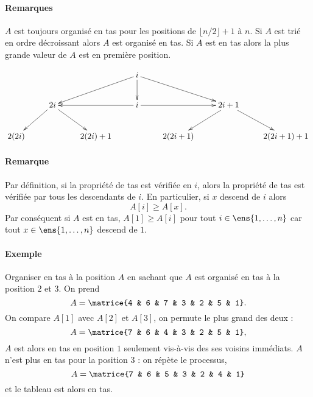 \documentclass{mybourbaki}
\begin{document}
 \paragraph{Remarques}$A$ est toujours organisé en tas pour les positions de $\lfloor n/2 \rfloor +1 $ à $n$. Si $A$ est trié en ordre décroissant alors $A$ est organisé en tas. Si $A$ est en tas alors la plus grande valeur de $A$ est en première position.
 
\[ 
\xymatrix{
& &&\ar[lld] i\ar[d] \ar[rrd]&&&\\
&\ar[ld] 2i \ar[rd] & & \ar[ll]i \ar[rr]& &\ar[ld] 2i +1 \ar[rd]& \\
2(2i) & & 2(2i)+1 & & 2(2i +1)& & 2(2i+1) +1 
}
\]


\paragraph{Remarque}Par définition, si la propriété de tas est vérifiée en $i$, alors la propriété de tas est vérifiée par tous les descendants de $i$. En particulier, si $x$ descend de $i$ alors $$A[i] \geq A[x].$$Par conséquent si $A$ est en tas, $A[1] \geq A[i]$ pour tout $i\in \ens{1,\ldots,n}$ car tout $x\in \ens{1,\ldots,n}$ descend de $1$.

\paragraph{Exemple}Organiser en tas à la position $A$ en sachant que $A$ est organisé en tas à la position $2$ et $3$. On prend $$A = \matrice{4 & 6 & 7 & 3 & 2 & 5 & 1}.$$
On compare $A[1]$ avec $A[2]$ et $A[3]$, on permute le plus grand des deux :
\[ A = \matrice{7 & 6 & 4 & 3 & 2 & 5 & 1},\]$A$ est alors en tas en position $1$ seulement vis-à-vis des ses voisins immédiats. $A$ n'est plus en tas pour la position $3$ : on répète le processus, \[A = \matrice{7 & 6 & 5 & 3 & 2 & 4 & 1} \]et le tableau est alors en tas.
\end{document}
